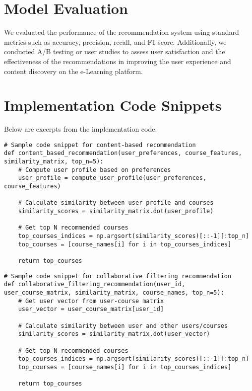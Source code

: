 \section{Model Evaluation}

We evaluated the performance of the recommendation system using standard 
metrics such as accuracy, precision, recall, and F1-score. Additionally, 
we conducted A/B testing or user studies to assess user satisfaction and 
the effectiveness of the recommendations in improving the user experience 
and content discovery on the e-Learning platform.

\section{Implementation Code Snippets}

Below are excerpts from the implementation code:

\begin{verbatim}
# Sample code snippet for content-based recommendation
def content_based_recommendation(user_preferences, course_features, similarity_matrix, top_n=5):
    # Compute user profile based on preferences
    user_profile = compute_user_profile(user_preferences, course_features)
    
    # Calculate similarity between user profile and courses
    similarity_scores = similarity_matrix.dot(user_profile)
    
    # Get top N recommended courses
    top_courses_indices = np.argsort(similarity_scores)[::-1][:top_n]
    top_courses = [course_names[i] for i in top_courses_indices]
    
    return top_courses
\end{verbatim}

\begin{verbatim}
# Sample code snippet for collaborative filtering recommendation
def collaborative_filtering_recommendation(user_id, user_course_matrix, similarity_matrix, course_names, top_n=5):
    # Get user vector from user-course matrix
    user_vector = user_course_matrix[user_id]
    
    # Calculate similarity between user and other users/courses
    similarity_scores = similarity_matrix.dot(user_vector)
    
    # Get top N recommended courses
    top_courses_indices = np.argsort(similarity_scores)[::-1][:top_n]
    top_courses = [course_names[i] for i in top_courses_indices]
    
    return top_courses
\end{verbatim}


